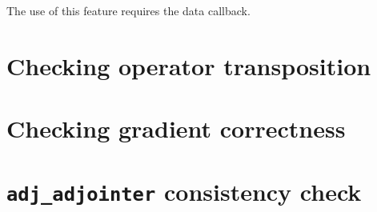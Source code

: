 The use of this feature requires the  data callback.

\section{Checking operator transposition}
\section{Checking gradient correctness} \label{sec:derivative_test}
\section{\texttt{adj_adjointer} consistency check}
